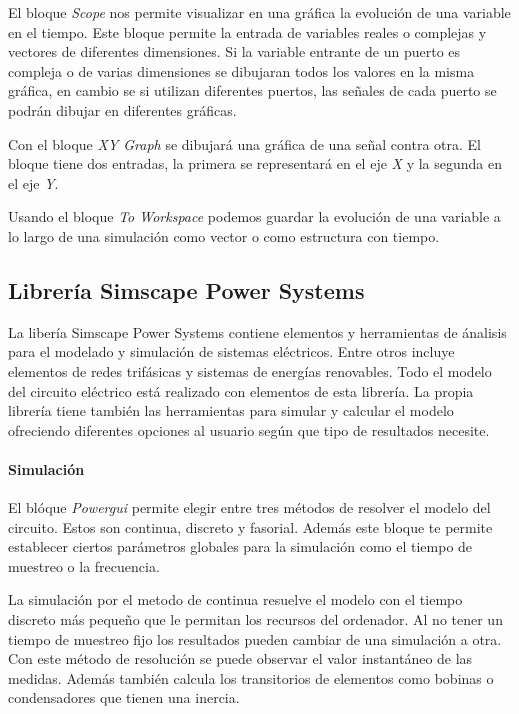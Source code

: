 \documentclass{book}
\begin{document}
El bloque \emph{Scope} nos permite visualizar en una gr\'afica la evoluci\'on de una variable en el tiempo. Este bloque permite la entrada de variables reales o complejas y vectores de diferentes dimensiones. Si la variable entrante de un puerto es compleja o de varias dimensiones se dibujaran todos los valores en la misma gr\'afica, en cambio se si utilizan diferentes puertos, las señales de cada puerto se podr\'an dibujar en diferentes gr\'aficas.  \par

Con el bloque \emph{XY Graph} se dibujar\'a una gr\'afica de una señal contra otra. El bloque tiene dos entradas, la primera se representar\'a en el eje \emph{X} y la segunda en el eje \emph{Y}.  \par

Usando el bloque \emph{To Workspace} podemos guardar la evoluci\'on de una variable a lo largo de una simulaci\'on como vector o como estructura con tiempo.  \par

		\subsection{Librer\'ia Simscape Power Systems}

La liber\'ia Simscape Power Systems contiene elementos y herramientas de \'analisis para el modelado y simulaci\'on de sistemas el\'ectricos. Entre otros incluye elementos de redes trif\'asicas y sistemas de energ\'ias renovables. Todo el modelo del circuito el\'ectrico est\'a realizado con elementos de esta librer\'ia. La propia librer\'ia tiene tambi\'en las herramientas para simular y calcular el modelo ofreciendo diferentes opciones al usuario seg\'un que tipo de resultados necesite. \par

		\paragraph {Simulaci\'on}
El bl\'oque \emph{Powergui} permite elegir entre tres m\'etodos de resolver el modelo del circuito. Estos son continua, discreto y fasorial. Adem\'as este bloque te permite establecer ciertos par\'ametros globales para la simulaci\'on como el tiempo de muestreo o la frecuencia.  \par

La simulaci\'on por el metodo de continua resuelve el modelo con el tiempo discreto m\'as pequeño que le permitan los recursos del ordenador. Al no tener un tiempo de muestreo fijo los resultados pueden cambiar de una simulaci\'on a otra. Con este m\'etodo de resoluci\'on se puede observar el valor instant\'aneo de las medidas. Adem\'as tambi\'en calcula  los transitorios de elementos como bobinas o condensadores que tienen una inercia. \par
\end{document}
